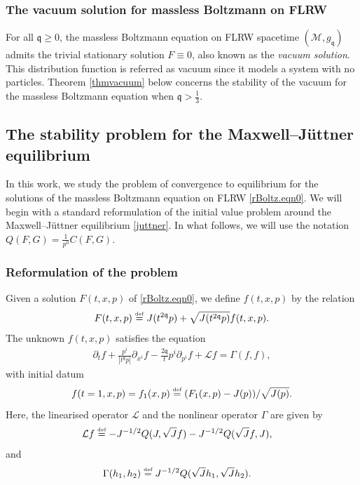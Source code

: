 \documentclass[reqno]{amsart}
\newcommand{\eqdef }{\overset{\mbox{\tiny{def}}}{=}}
\newcommand{\pv}{p}
\newcommand{\qq}{\mathfrak{q}}
\newcommand{\tq}{t^{\qq}}
\newcommand{\linL}{\mathcal{L}}
\theoremstyle{definition}
\numberwithin{equation}{section}
\numberwithin{theorem}{section}
\begin{document}
\subsubsection{The vacuum solution for massless Boltzmann on FLRW}

For all \(\qq\geq 0\), the massless Boltzmann equation on FLRW spacetime \((\mathcal{M},g_{\qq})\) admits the trivial stationary solution \(F\equiv 0\), also known as the \emph{vacuum solution}. This distribution function is referred as vacuum since it models a system with no particles. Theorem \ref{thmvacuum} below concerns the stability of the vacuum for the massless Boltzmann equation when \(\qq>\frac{1}{3}\).



\subsection{The stability problem for the Maxwell--J\"uttner equilibrium}

In this work, we study the problem of convergence to equilibrium for the solutions of the massless Boltzmann equation on FLRW \eqref{rBoltz.eqn0}. We will begin with a standard reformulation of the initial value problem around the Maxwell--J\"uttner equilibrium \eqref{juttner}. In what follows, we will use the notation
\(Q(F,G) = \frac{1}{p^0}C(F,G).\)



\subsubsection{Reformulation of the problem}

Given a solution \(F(t,x,p)\) of \eqref{rBoltz.eqn0}, we define \(f(t,x,p)\) by the relation
\begin{align}\label{standard.perturbation}
    F(t,x,p) \eqdef J(t^{2\qq}p) +\sqrt{J(t^{2\qq}p) } f(t,x,p).
\end{align}
The unknown \(f(t,x,p)\) satisfies the equation
\begin{align}
        \partial_t f+ \frac{\pv^i}{|\tq \pv|}\partial_{x^i} f
    -\frac{2\qq }{t} p^i \partial_{p^i} f
    +
    \linL f
=
\Gamma (f,f),
\label{rBoltz00}
\end{align}
with initial datum 
\begin{equation}\label{idff}
f(t=1,x,\pv)=f_1(x,\pv)\eqdef (F_1(x,\pv)-J(\pv))/\sqrt{J(\pv)}.
\end{equation}
Here, the linearised operator \(\linL\) and the nonlinear operator \(\Gamma\) are given by
\begin{align}
     \linL f
 & \eqdef 
 -J^{-1/2}Q(J ,\sqrt{J} f)- J^{-1/2}Q(\sqrt{J} f,J) ,
 \label{L0}
\end{align}
and
\begin{align}
\Gamma (h_1,h_2)
&\eqdef
 J^{-1/2}Q(\sqrt{J} h_1,\sqrt{J} h_2).
\label{gamma0}
\end{align}
\end{document}
